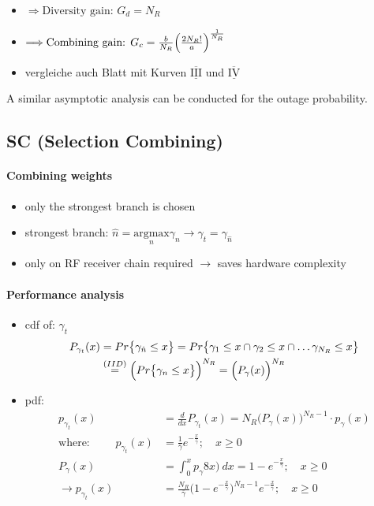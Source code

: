 \documentclass[a4paper, 10pt]{article}
\newcommand{\rom}[1]{$\underline{\overline{\text{#1}}}$}
\begin{document}
\begin{itemize}
\begin{itemize}
		\item[] $\Longrightarrow \text{Diversity gain: } G_d = N_R$
		\item[] $\Longrightarrow \text{Combining gain: } G_c = \frac{b}{N_R}\Bigl( \frac{2N_R!}{a}\Bigr)^{\frac{1}{N_R}}$
		\item[] vergleiche auch Blatt mit Kurven \rom{III} und \rom{IV}
	\end{itemize}
\end{itemize}
A similar asymptotic analysis can be conducted for the outage probability.
\subsection{SC (Selection Combining)}
\paragraph*{Combining weights}
	\begin{itemize}
		\item only the strongest branch is chosen
		\item strongest branch: $\hat{n} = \underset{n}{\text{argmax}} \gamma _n \longrightarrow \gamma _t = \gamma _{\hat{n}}$
		\item only on RF receiver chain required $\rightarrow$\; saves hardware complexity 
	\end{itemize}
\paragraph*{Performance analysis}
	\begin{itemize}
		\item cdf of: $\gamma _t$
			\begin{align*}
				P_{\gamma _t}(x) &= Pr\bigl\{\gamma _{\hat{n}} \leq x\bigr\} = Pr\bigl\{\gamma _1 \leq x \cap \gamma _2 \leq x \cap \dots \gamma _{N_R} \leq x\bigr\}\\
				&\overset{(IID)}{=} \Bigl(Pr\bigl\{\gamma _n \leq x\bigr\}\Bigr)^{N_R} = \Bigl( P_{\gamma}(x)\Bigr)^{N_R}
			\end{align*}
		\item pdf:
			\begin{align*}
				p_{\gamma _t}(x) &= \frac{d}{dx}P_{\gamma _t}(x) = N_R\bigl(P_{\gamma}(x)\bigr)^{N_R-1}\cdot p_{\gamma}(x)\\
				\text{where: }\qquad p_{\gamma _t}(x) &= \frac{1}{\bar{\gamma}}e^{-\frac{x}{\bar{\gamma}}};\quad x\geq 0\\
				P_{\gamma}(x) &= \int_{0}^{x}p_{\gamma}8x)~dx = 1 - e^{-\frac{x}{\bar{\gamma}}};\quad x\geq 0\\
				\rightarrow p_{\gamma _t}(x) &= \frac{N_R}{\bar{\gamma}}\bigl( 1 - e^{-\frac{x}{\bar{\gamma}}}\bigr)^{N_R-1}e^{-\frac{x}{\bar{\gamma}}};\quad x\geq 0
			\end{align*}
	\end{itemize}
\end{document}

